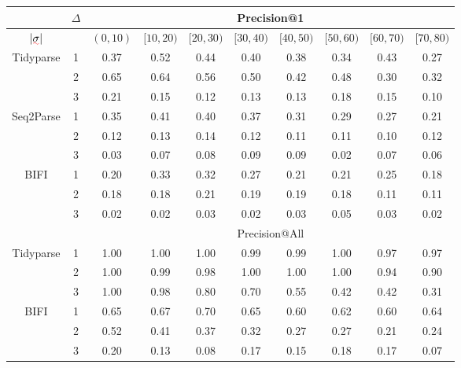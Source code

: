 \documentclass[sigplan,review,acmsmall,nonacm,screen,anonymous]{acmart}\settopmatter{printfolios=false,printccs=false,printacmref=false}
\begin{document}
\begin{table}[!h]
\centering
\begin{tabular}{c|c|cccccccc}
\hline\hline
& $\Delta$ & \multicolumn{8}{c}{Precision@1} \\ \hline
$|\err\sigma|$ &  & $(0,10)$ & $[10,20)$ & $[20,30)$ & $[30, 40)$ & $[40,50)$ & $[50, 60)$ & $[60,70)$ & $[70, 80)$ \\ \hline
Tidyparse
& 1 & 0.37 & 0.52 & 0.44 & 0.40 & 0.38 & 0.34 & 0.43 & 0.27 \\
& 2 & 0.65 & 0.64 & 0.56 & 0.50 & 0.42 & 0.48 & 0.30 & 0.32 \\
& 3 & 0.21 & 0.15 & 0.12 & 0.13 & 0.13 & 0.18 & 0.15 & 0.10 \\ \hline
Seq2Parse
& 1 & 0.35 & 0.41 & 0.40 & 0.37 & 0.31 & 0.29 & 0.27 & 0.21 \\
& 2 & 0.12 & 0.13 & 0.14 & 0.12 & 0.11 & 0.11 & 0.10 & 0.12 \\
& 3 & 0.03 & 0.07 & 0.08 & 0.09 & 0.09 & 0.02 & 0.07 & 0.06 \\ \hline
BIFI
& 1 & 0.20 & 0.33 & 0.32 & 0.27 & 0.21 & 0.21 & 0.25 & 0.18 \\
& 2 & 0.18 & 0.18 & 0.21 & 0.19 & 0.19 & 0.18 & 0.11 & 0.11 \\
& 3 & 0.02 & 0.02 & 0.03 & 0.02 & 0.03 & 0.05 & 0.03 & 0.02 \\ \hline
& & \multicolumn{8}{c}{Precision@All} \\ \hline
Tidyparse
& 1 & 1.00 & 1.00 & 1.00 & 0.99 & 0.99 & 1.00 & 0.97 & 0.97 \\
& 2 & 1.00 & 0.99 & 0.98 & 1.00 & 1.00 & 1.00 & 0.94 & 0.90 \\
& 3 & 1.00 & 0.98 & 0.80 & 0.70 & 0.55 & 0.42 & 0.42 & 0.31 \\ \hline
BIFI
& 1 & 0.65 & 0.67 & 0.70 & 0.65 & 0.60 & 0.62 & 0.60 & 0.64 \\
& 2 & 0.52 & 0.41 & 0.37 & 0.32 & 0.27 & 0.27 & 0.21 & 0.24 \\
& 3 & 0.20 & 0.13 & 0.08 & 0.17 & 0.15 & 0.18 & 0.17 & 0.07 \\ \hline\hline
\end{tabular}
\end{table}
\end{document}
